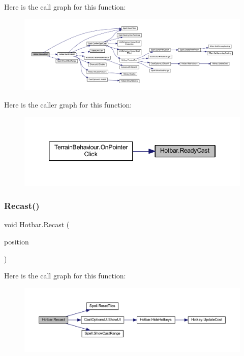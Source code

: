 Here is the call graph for this function\+:\nopagebreak
\begin{figure}[H]
\begin{center}
\leavevmode
\includegraphics[width=350pt]{class_hotbar_a5ac379c585126b8e0e35c061b3388ecf_cgraph}
\end{center}
\end{figure}
Here is the caller graph for this function\+:\nopagebreak
\begin{figure}[H]
\begin{center}
\leavevmode
\includegraphics[width=346pt]{class_hotbar_a5ac379c585126b8e0e35c061b3388ecf_icgraph}
\end{center}
\end{figure}
\mbox{\label{class_hotbar_acda305961d329d3b329dbe4247539ef5}} 
\subsubsection{\texorpdfstring{Recast()}{Recast()}}
{\footnotesize\ttfamily void Hotbar.\+Recast (\begin{DoxyParamCaption}\item[{Vector2\+Int}]{position }\end{DoxyParamCaption})}

Here is the call graph for this function\+:\nopagebreak
\begin{figure}[H]
\begin{center}
\leavevmode
\includegraphics[width=350pt]{class_hotbar_acda305961d329d3b329dbe4247539ef5_cgraph}
\end{center}
\end{figure}
\mbox{\label{class_hotbar_a989b6728a8d86d60a851f68954edab90}} 
